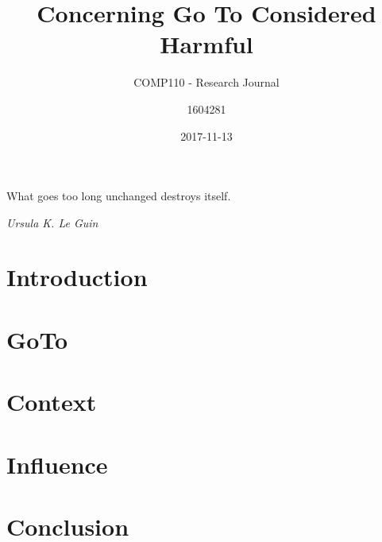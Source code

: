 \documentclass{scrartcl}
\title{Concerning Go To Considered Harmful}
\subtitle{COMP110 - Research Journal}
\date{2017-11-13}
\author{1604281}
\begin{document}
\maketitle
{}

\epigraph{What goes too long unchanged destroys itself.}{\textit{Ursula K. Le Guin}}

\section{Introduction}



\section{GoTo}




\section{Context}



\section{Influence}



\section{Conclusion}




\end{document}
